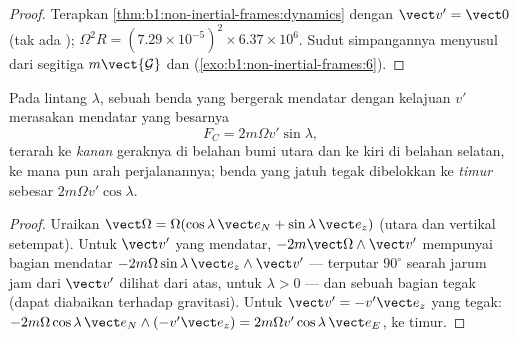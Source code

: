 \begin{proof}
Terapkan \cref{thm:b1:non-inertial-frames:dynamics} dengan $\vect v' = \vect 0$
(tak ada ); $\Omega^2R = (7.29\times10^{-5})^2 \times 6.37\times10^6$.
Sudut simpangannya menyusul dari segitiga $m\vect{\mathcal G}$ dan  (\cref{exo:b1:non-inertial-frames:6}).
\end{proof}

\begin{proposition}\label{prop:b1:non-inertial-frames:coriolis}
Pada lintang $\lambda$, sebuah benda yang bergerak mendatar dengan kelajuan $v'$
merasakan  mendatar yang besarnya
\[
F_C = 2m\Omega v'\sin\lambda ,
\]
terarah ke \emph{kanan} geraknya di belahan bumi utara dan
ke kiri di belahan selatan, ke mana pun arah perjalanannya; benda
yang jatuh tegak dibelokkan ke \emph{timur} sebesar $2m\Omega v'\cos\lambda$.
\end{proposition}

\begin{proof}
Uraikan $\vect\Omega = \Omega(\cos\lambda\,\vect e_N + \sin\lambda\,\vect e_z)$
(utara dan vertikal setempat). Untuk $\vect v'$ yang mendatar, $-2m\vect\Omega\wedge\vect v'$
mempunyai bagian mendatar $-2m\Omega\sin\lambda\,\vect e_z\wedge\vect v'$ --- terputar
$90^\circ$ searah jarum jam dari $\vect v'$ dilihat dari atas, untuk $\lambda > 0$ ---
dan sebuah bagian tegak (dapat diabaikan terhadap gravitasi). Untuk $\vect v' =
-v'\vect e_z$ yang tegak: $-2m\Omega\cos\lambda\,\vect e_N\wedge(-v'\vect e_z) = 2m\Omega v'\cos\lambda\,
\vect e_E$, ke timur.
\end{proof}

